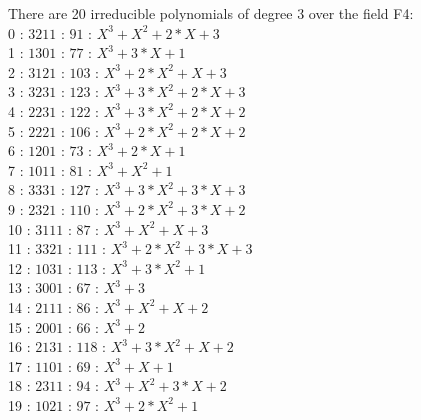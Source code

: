 There are 20 irreducible polynomials of degree 3 over the field F4:\\
0 : $3211$ : $91$ : $X^3+X^2+2*X+3$\\
1 : $1301$ : $77$ : $X^3+3*X+1$\\
2 : $3121$ : $103$ : $X^3+2*X^2+X+3$\\
3 : $3231$ : $123$ : $X^3+3*X^2+2*X+3$\\
4 : $2231$ : $122$ : $X^3+3*X^2+2*X+2$\\
5 : $2221$ : $106$ : $X^3+2*X^2+2*X+2$\\
6 : $1201$ : $73$ : $X^3+2*X+1$\\
7 : $1011$ : $81$ : $X^3+X^2+1$\\
8 : $3331$ : $127$ : $X^3+3*X^2+3*X+3$\\
9 : $2321$ : $110$ : $X^3+2*X^2+3*X+2$\\
10 : $3111$ : $87$ : $X^3+X^2+X+3$\\
11 : $3321$ : $111$ : $X^3+2*X^2+3*X+3$\\
12 : $1031$ : $113$ : $X^3+3*X^2+1$\\
13 : $3001$ : $67$ : $X^3+3$\\
14 : $2111$ : $86$ : $X^3+X^2+X+2$\\
15 : $2001$ : $66$ : $X^3+2$\\
16 : $2131$ : $118$ : $X^3+3*X^2+X+2$\\
17 : $1101$ : $69$ : $X^3+X+1$\\
18 : $2311$ : $94$ : $X^3+X^2+3*X+2$\\
19 : $1021$ : $97$ : $X^3+2*X^2+1$\\
